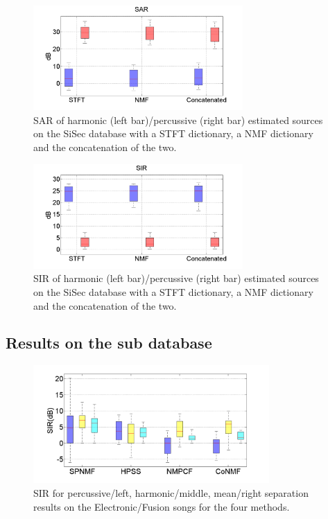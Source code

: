 \documentclass[journal]{IEEEtran}
\begin{document}
\begin{figure}[htb]

  \centering 
  \includegraphics[width=8cm]{fig/DictSAR.png}
  \caption{\label{resultsDictSAR} SAR of harmonic (left bar)/percussive (right bar) estimated sources on the SiSec database with a STFT dictionary, a NMF dictionary and the concatenation of the two.}
  
\end{figure}
\begin{figure}[htb]

  \centering 
  \includegraphics[width=8cm]{fig/DictSIR.png}
  \caption{\label{resultsDictSIR} SIR of harmonic (left bar)/percussive (right bar) estimated sources on the SiSec database with a STFT dictionary, a NMF dictionary and the concatenation of the two.}
  
\end{figure}

\subsection{Results on the sub database}

\begin{figure}[h]

  \centering 
  \includegraphics[width=9cm]{fig/ElectroFusionSIR.png}
  \caption{\label{ElectroFusionSIR} SIR for percussive/left, harmonic/middle, mean/right separation results on the Electronic/Fusion songs for the four methods.}
  
\end{figure}
\end{document}

